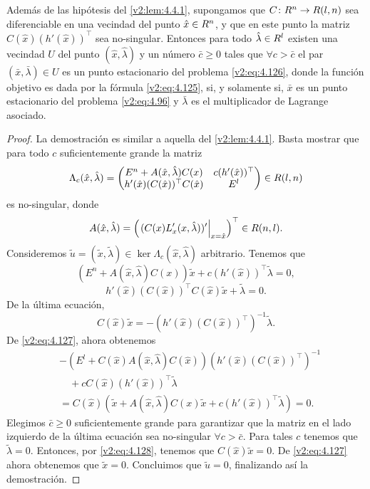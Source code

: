 \begin{lemma}\label{v2:lem:4.4.2}
    Además de las hipótesis del \cref{v2:lem:4.4.1}, supongamos que $C \colon R^n \to R(l, n)$ sea diferenciable en una vecindad del punto $\hat{x} \in R^n$, y que en este punto la matriz $C(\hat{x})(h'(\hat{x}))^\top$ sea no-singular.
    Entonces para todo $\hat{\lambda} \in R^l$ existen una vecindad $U$ del punto $(\hat{x}, \hat{\lambda})$ y un número $\bar{c} \ge 0$ tales que $\forall c > \bar{c}$ el par $(\bar{x}, \bar{\lambda}) \in U$ es un punto estacionario del problema \eqref{v2:eq:4.126}, donde la función objetivo es dada por la fórmula \eqref{v2:eq:4.125}, si, y solamente si, $\bar{x}$ es un punto estacionario del problema \eqref{v2:eq:4.96} y $\bar{\lambda}$ es el multiplicador de Lagrange asociado.
\end{lemma}
\begin{proof}
    La demostración es similar a aquella del \cref{v2:lem:4.4.1}. Basta mostrar que para todo $c$ suficientemente grande la matriz
    \[
        \Lambda_c(\hat{x}, \hat{\lambda}) = \begin{pmatrix} E^n + A(\hat{x}, \hat{\lambda})C(x) & c(h'(\hat{x}))^\top \\ h'(\hat{x})(C(\hat{x}))^\top C(\hat{x}) & E^l \end{pmatrix} \in R(l, n)
    \]
    es no-singular, donde
    \[
        A(\hat{x}, \hat{\lambda}) = \left( \left. (C(x)L'_x(x, \hat{\lambda}))' \right|_{x=\hat{x}} \right)^\top \in R(n, l).
    \]
    Consideremos $\tilde{u} = (\tilde{x}, \tilde{\lambda}) \in \ker \Lambda_c(\hat{x}, \hat{\lambda})$ arbitrario. Tenemos que
    \begin{equation}
        (E^n + A(\hat{x}, \hat{\lambda})C(x))\tilde{x} + c(h'(\hat{x}))^\top \tilde{\lambda} = 0,
        \label{v2:eq:4.127}
    \end{equation}
    \begin{equation}
        h'(\hat{x})(C(\hat{x}))^\top C(\hat{x})\tilde{x} + \tilde{\lambda} = 0.
        \label{v2:eq:4.128}
    \end{equation}
    De la última ecuación,
    \[
        C(\hat{x})\tilde{x} = -(h'(\hat{x})(C(\hat{x}))^\top)^{-1}\tilde{\lambda}.
    \]
    De \eqref{v2:eq:4.127}, ahora obtenemos
    \begin{align*}
        &-(E^l + C(\hat{x})A(\hat{x}, \hat{\lambda})C(\hat{x}))(h'(\hat{x})(C(\hat{x}))^\top)^{-1} \\
        &\quad + c C(\hat{x})(h'(\hat{x}))^\top \tilde{\lambda} \\
        &= C(\hat{x})(\tilde{x} + A(\hat{x}, \hat{\lambda})C(x)\tilde{x} + c(h'(\hat{x}))^\top \tilde{\lambda}) = 0.
    \end{align*}
    Elegimos $\bar{c} \ge 0$ suficientemente grande para garantizar que la matriz en el lado izquierdo de la última ecuación sea no-singular $\forall c > \bar{c}$. Para tales $c$ tenemos que $\tilde{\lambda} = 0$. Entonces, por \eqref{v2:eq:4.128}, tenemos que $C(\hat{x})\tilde{x} = 0$. De \eqref{v2:eq:4.127} ahora obtenemos que $\tilde{x} = 0$. Concluimos que $\tilde{u} = 0$, finalizando así la demostración.
\end{proof}

